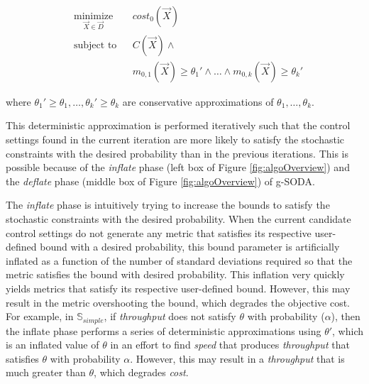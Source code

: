 \documentclass[a4paper, 12pt]{article} %
\begin{document}

\begin{equation}
\label{eq:detApprox}
\begin{aligned}
& \underset{\vec{X}\in\vec{D}}{\text{minimize}}
& & \textit{cost}_0(\vec{X}) \\
& \text{subject to}
& & C(\vec{X}) \wedge \\
&&& m_{0,1}(\vec{X})\ge  \theta_1{'}\wedge\dots \wedge m_{0,k}(\vec{X})\ge  \theta_k{'} 
\end{aligned}
\end{equation}


where $\theta_1{'} \ge \theta_1,\dots,\theta_k{'} \ge \theta_k$ are conservative approximations of $\theta_1,\dots,\theta_k$. 

%

This deterministic approximation is performed iteratively such that the control settings found in the current iteration are more likely to satisfy the stochastic constraints with the desired probability than in the previous iterations. This is possible because of the \textit{inflate} phase (left box of Figure \ref{fig:algoOverview}) and the \textit{deflate} phase (middle box of Figure \ref{fig:algoOverview}) of g-SODA. 

The \textit{inflate} phase is intuitively trying to increase the bounds to satisfy the stochastic constraints with the desired probability. 
When the current candidate control settings do not generate any metric that satisfies its respective user-defined bound with a desired probability, this bound parameter is artificially inflated as a function of the number of standard deviations required so that the metric satisfies the bound with desired probability.
This inflation very quickly yields metrics that satisfy its respective user-defined bound. However, this may result in the metric overshooting the bound, which degrades the objective cost. 
For example, in $\mathbb{S}_{simple}$, if \textit{throughput} does not satisfy $\theta$ with probability ($\alpha$), then the inflate phase performs a series of deterministic approximations using $\theta'$, which is an inflated value of $\theta$ in an effort to find \textit{speed} that produces \textit{throughput} that satisfies $\theta$ with probability $\alpha$. However, this may result in a \textit{throughput} that is much greater than $\theta$, which degrades \textit{cost}.
\end{document}
